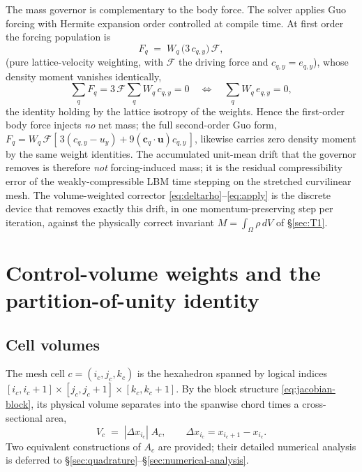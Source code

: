 \documentclass[11pt]{article}
\theoremstyle{definition}
\theoremstyle{remark}
\begin{document}
The mass governor is complementary to the body force. The solver applies Guo
forcing \cite{GuoZhengShi2002} with Hermite expansion order controlled at compile
time. At first order the forcing population is
\begin{equation}
F_q \;=\; W_q\,\bigl(3\,c_{q,y}\bigr)\,\mathcal{F},
\label{eq:guo1}
\end{equation}
(pure lattice-velocity weighting, with $\mathcal F$ the driving force and
$c_{q,y}=e_{q,y}$), whose density moment vanishes identically,
\begin{equation}
\sum_q F_q
=3\,\mathcal{F}\sum_q W_q\,c_{q,y}=0
\quad\Longleftrightarrow\quad
\sum_q W_q\,e_{q,y}=0 ,
\label{eq:guo1-massmoment}
\end{equation}
the identity holding by the lattice isotropy of the weights. Hence the
first-order body force injects \emph{no} net mass; the full second-order Guo
form, $F_q=W_q\,\mathcal F[\,3(c_{q,y}-u_y)+9(\mathbf c_q\!\cdot\mathbf u)c_{q,y}\,]$,
likewise carries zero density moment by the same weight identities. The
accumulated unit-mean drift that the governor removes is therefore \emph{not}
forcing-induced mass; it is the residual compressibility error of the
weakly-compressible LBM time stepping on the stretched curvilinear mesh. The
volume-weighted corrector \eqref{eq:deltarho}--\eqref{eq:apply} is the discrete
device that removes exactly this drift, in one momentum-preserving step per
iteration, against the physically correct invariant $M=\int_\Omega\rho\,dV$ of
\S\ref{sec:T1}.

\section{Control-volume weights and the partition-of-unity identity}
\label{sec:weights}

\subsection{Cell volumes}
\label{sec:T3-cells}
The mesh cell $c=(i_c,j_c,k_c)$ is the hexahedron spanned by logical indices
$[i_c,i_c{+}1]\times[j_c,j_c{+}1]\times[k_c,k_c{+}1]$. By the block structure
\eqref{eq:jacobian-block}, its physical volume separates into the spanwise chord
times a cross-sectional area,
\begin{equation}
V_c \;=\; |\Delta x_{i_c}|\;A_c,
\qquad
\Delta x_{i_c}=x_{i_c+1}-x_{i_c}.
\label{eq:Vc-split}
\end{equation}
Two equivalent constructions of $A_c$ are provided; their detailed numerical
analysis is deferred to \S\ref{sec:quadrature}--\S\ref{sec:numerical-analysis}.
\end{document}
